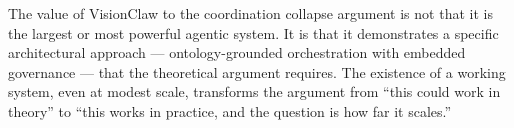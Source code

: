 \begin{keyinsight}
The value of VisionClaw to the coordination collapse argument is not that it is the largest or most powerful agentic system. It is that it demonstrates a specific architectural approach --- ontology-grounded orchestration with embedded governance --- that the theoretical argument requires. The existence of a working system, even at modest scale, transforms the argument from ``this could work in theory'' to ``this works in practice, and the question is how far it scales.''
\end{keyinsight}
